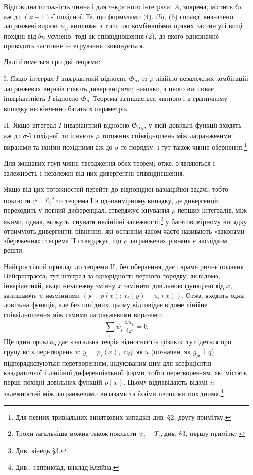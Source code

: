 \documentclass[11pt]{article}
\providecommand{\G}{\mathfrak G}
\providecommand{\dd}{\mathrm d}
\begin{document}
Відповідна тотожність чинна і для \(n\)-кратного інтеграла; \(A\), зокрема, містить \(\delta u\) аж до \((\kappa-1)\)-ї похідної. Те, що формулами (4), (5), (6) справді визначено лагранжеві вирази \(\psi_i\), випливає з того, що комбінаціями правих частин усі вищі похідні від \(\delta u\) усунено, тоді як співвідношення (2), до якого однозначно приводить частинне інтегрування, виконується.

Далі йтиметься про дві теореми:

I. Якщо інтеграл \(I\) інваріантний відносно \(\G_\rho\), то \(\rho\) лінійно незалежних комбінацій лагранжевих виразів стають дивергенціями; навпаки, з цього випливає інваріантність \(I\) відносно \(\G_\rho\). Теорема залишається чинною і в граничному випадку нескінченно багатьох параметрів.

II. Якщо інтеграл \(I\) інваріантний відносно \(\G_{\infty\rho}\), у якій довільні функції входять аж до \(\sigma\)-ї похідної, то існують \(\rho\) тотожних співвідношень між лагранжевими виразами та їхніми похідними аж до \(\sigma\)-го порядку; і тут також чинне обернення.\footnote{Для певних тривіальних виняткових випадків див. \S{}2, другу примітку.}

Для змішаних груп чинні твердження обох теорем; отже, з'являються і залежності, і незалежні від них дивергентні співвідношення.

Якщо від цих тотожностей перейти до відповідної варіаційної задачі, тобто покласти \(\psi=0\),\footnote{Трохи загальніше можна також покласти \(\psi_i=T_i\), див. \S{}3, першу примітку.} то теорема I в одновимірному випадку, де дивергенція переходить у повний диференціал, стверджує існування \(\rho\) перших інтегралів, між якими, однак, можуть існувати нелінійні залежності;\footnote{Див. кінець \S{}3.} у багатовимірному випадку отримують дивергентні рівняння, які останнім часом часто називають «законами збереження»; теорема II стверджує, що \(\rho\) лагранжевих рівнянь є наслідком решти.

Найпростіший приклад до теореми II, без обернення, дає параметричне подання Вейєрштрасса; тут інтеграл за однорідності першого порядку, як відомо, інваріантний, якщо незалежну змінну \(x\) замінити довільною функцією від \(x\), залишаючи \(u\) незмінними \((y=p(x);\ v_i(y)=u_i(x))\). Отже, входить одна довільна функція, але без похідних; цьому відповідає відоме лінійне співвідношення між самими лагранжевими виразами:
\[
\sum_i \psi_i\,\frac{\dd u_i}{\dd x}=0.
\]
Ще один приклад дає «загальна теорія відносності» фізиків; тут ідеться про групу всіх перетворень \(x\): \(y_i=p_i(x)\), тоді як \(u\) (позначені як \(g_{\mu\nu}\) і \(q\)) підпорядковуються перетворенням, індукованим цим для коефіцієнтів квадратичної і лінійної диференціальної форми, тобто перетворенням, які містять перші похідні довільних функцій \(p(x)\). Цьому відповідають відомі \(n\) залежностей між лагранжевими виразами та їхніми першими похідними.\footnote{Див., наприклад, виклад Кляйна.}
\end{document}
